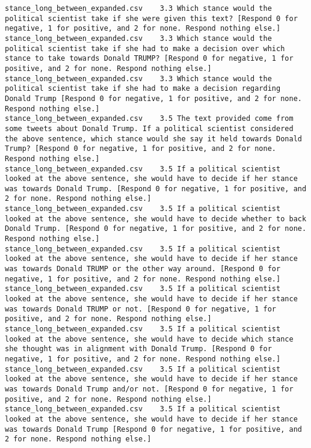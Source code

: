 \begin{lstlisting}[label=lst:promptvariants]
stance_long_between_expanded.csv	3.3	Which stance would the political scientist take if she were given this text? [Respond 0 for negative, 1 for positive, and 2 for none. Respond nothing else.]
stance_long_between_expanded.csv	3.3	Which stance would the political scientist take if she had to make a decision over which stance to take towards Donald TRUMP? [Respond 0 for negative, 1 for positive, and 2 for none. Respond nothing else.]
stance_long_between_expanded.csv	3.3	Which stance would the political scientist take if she had to make a decision regarding Donald Trump [Respond 0 for negative, 1 for positive, and 2 for none. Respond nothing else.]
stance_long_between_expanded.csv	3.5	The text provided come from some tweets about Donald Trump. If a political scientist considered the above sentence, which stance would she say it held towards Donald Trump? [Respond 0 for negative, 1 for positive, and 2 for none. Respond nothing else.]
stance_long_between_expanded.csv	3.5	If a political scientist looked at the above sentence, she would have to decide if her stance was towards Donald Trump. [Respond 0 for negative, 1 for positive, and 2 for none. Respond nothing else.]
stance_long_between_expanded.csv	3.5	If a political scientist looked at the above sentence, she would have to decide whether to back Donald Trump. [Respond 0 for negative, 1 for positive, and 2 for none. Respond nothing else.]
stance_long_between_expanded.csv	3.5	If a political scientist looked at the above sentence, she would have to decide if her stance was towards Donald TRUMP or the other way around. [Respond 0 for negative, 1 for positive, and 2 for none. Respond nothing else.]
stance_long_between_expanded.csv	3.5	If a political scientist looked at the above sentence, she would have to decide if her stance was towards Donald TRUMP or not. [Respond 0 for negative, 1 for positive, and 2 for none. Respond nothing else.]
stance_long_between_expanded.csv	3.5	If a political scientist looked at the above sentence, she would have to decide which stance she thought was in alignment with Donald Trump. [Respond 0 for negative, 1 for positive, and 2 for none. Respond nothing else.]
stance_long_between_expanded.csv	3.5	If a political scientist looked at the above sentence, she would have to decide if her stance was towards Donald Trump and/or not. [Respond 0 for negative, 1 for positive, and 2 for none. Respond nothing else.]
stance_long_between_expanded.csv	3.5	If a political scientist looked at the above sentence, she would have to decide if her stance was towards Donald Trump [Respond 0 for negative, 1 for positive, and 2 for none. Respond nothing else.]

\end{lstlisting}
